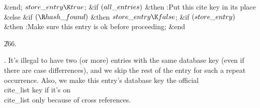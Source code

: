 \&{end};\2\6
$\\{store\_entry}\K\\{true}$;\6
\&{if} $(\\{all\_entries})$ \1\&{then}\5
:Put this cite key in its place\X\6
\4\&{else} \&{if} $(\R\\{hash\_found})$ \1\&{then}\5
$\\{store\_entry}\K\\{false}$;\2\2%
\6
\&{if} $(\\{store\_entry})$ \1\&{then}\5
:Make sure this entry is ok before proceeding\X;\2\6
\&{end}\par
\U266.\fi

.
It's illegal to have two (or more) entries with the same database key
(even if there are case differrences), and we skip the rest of the
entry for such a repeat occurrence.  Also, we make this entry's
database key the official \\{cite\_list} key if it's on \\{cite\_list} only
because of cross references.


